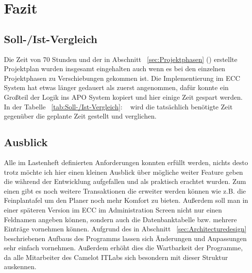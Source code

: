 \section{Fazit} 
\label{sec:Fazit}

\subsection{Soll-/Ist-Vergleich}
\label{sec:SollIstVergleich}
Die Zeit von 70 Stunden und der in Abschnitt ~\ref{sec:Projektphasen} () erstellte Projektplan wurden insgesamt eingehalten auch wenn es bei den einzelnen Projektphasen zu Verschiebungen gekommen ist. Die Implementierung im \ac{ECC} System hat etwas länger gedauert als zuerst angenommen, dafür konnte ein Großteil der Logik ins \ac{APO} System kopiert und hier einige Zeit gespart werden. In der Tabelle ~\ref{tab:Soll-/Ist-Vergleich}: ~ wird die tatsächlich benötigte Zeit gegenüber die geplante Zeit gestellt und verglichen.

\subsection{Ausblick}
\label{sec:Ausblick}
Alle im Lastenheft definierten Anforderungen konnten erfüllt werden, nichts desto trotz möchte ich hier einen kleinen Ausblick über mögliche weiter Feature geben die während der Entwicklung aufgefallen und als praktisch erachtet wurden. Zum einen gibt es noch weitere Transaktionen die erweiter werden können wie z.B. die Feinplantafel um den Planer noch mehr Komfort zu bieten. Außerdem soll man in einer späteren Version im \ac{ECC} im Administration Screen nicht nur einen Feldnamen angeben können, sondern auch die Datenbanktabelle bzw. mehrere Einträge vornehmen können. Aufgrund des in Abschnitt ~\ref{sec:Architecturedesign} beschriebenen Aufbaus des Programms lassen sich Änderungen und Anpassungen sehr einfach vornehmen. Außerdem erhöht dies die Wartbarkeit der Programme, da alle Mitarbeiter des Camelot ITLabs sich besondern mit dieser Struktur auskennen. 
